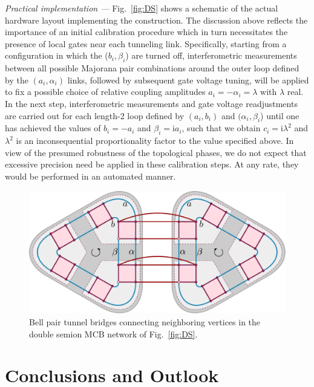 \documentclass[twocolumn,floats,prx,showpacs]{revtex4-1}
\begin{document}
\emph{Practical implementation ---} Fig.~\ref{fig:DS} shows a schematic of the actual hardware layout implementing the construction. The discussion above reflects the importance of an initial calibration procedure which in turn  necessitates the presence of  local gates near each tunneling link. Specifically,  starting from a configuration in which the ($b_i,\beta_i$) are  turned off, interferometric measurements \cite{Plugge2017,Karzig2017}  between all possible Majorana pair combinations around the outer loop defined by the $(a_i,\alpha_i)$ links, followed by subsequent gate voltage tuning, will be applied to fix a possible choice of relative coupling amplitudes  $a_i=-\alpha_i=\lambda$ with $\lambda$ real. In the next step, interferometric measurements and gate voltage readjustments  are carried out for each length-2 loop defined by $(a_i,b_i)$ and $(\alpha_i,\beta_i$) until one has achieved the values of $b_i=-a_i$ and $\beta_i=\mathrm i a_i$, such that we obtain $c_i =\mathrm i \lambda^2$ and $\lambda^2$ is an inconsequential proportionality factor to the value specified above.  In view of the presumed robustness of the topological phases, we do not expect that excessive precision need be applied in these calibration steps. At any rate, they would be performed in an automated manner.


\begin{figure}
\includegraphics[width=0.9\columnwidth]{fig/tworing.pdf}
\caption{Bell pair tunnel bridges 
connecting neighboring vertices in the double semion MCB network of Fig.~\ref{fig:DS}.  }
\label{fig:tworings}
\end{figure}

\section{Conclusions and Outlook}\label{sec5}
\end{document}
